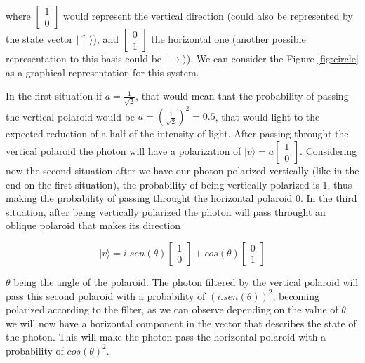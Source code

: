 where $\left[\begin{array}{c}
1\\
0
\end{array}\right]$ would represent the vertical direction (could also be represented by the state vector $\vert\uparrow\rangle$), and $\left[\begin{array}{c}
0\\
1
\end{array}\right] $ the horizontal one (another possible representation to this basis could be $\vert\rightarrow\rangle$). We can consider the Figure \ref{fig:circle} as a graphical representation for this system.

In the first situation if $a = \frac{1}{\sqrt{2}}$, that would mean that the probability of passing the vertical polaroid would be $a = (\frac{1}{\sqrt{2}})^{2} = 0.5$, that would light to the expected reduction of a half of the intensity of light. After passing throught the vertical polaroid the photon will have a polarization of $\vert v \rangle = a\left[\begin{array}{c}
1\\
0
\end{array}\right]$. Considering now the second situation after we have our photon polarized vertically (like in the end on the first situation), the probability of being vertically polarized is 1, thus making the probability of passing throught the horizontal polaroid 0.
In the third situation, after being vertically polarized the photon will pass throught an oblique polaroid that makes its direction

\begin{equation}
\vert v \rangle = i.sen(\theta) \left[\begin{array}{c}
1\\
0
\end{array}\right]+ cos(\theta)\left[\begin{array}{c}
0\\
1
\end{array}\right]
\end{equation}



$\theta$ being the angle of the polaroid. The photon filtered by the vertical polaroid will pass this second polaroid with a probability of $(i.sen(\theta))^{2}$, becoming polarized according to the filter, as we can observe depending on the value of $\theta$ we will now have a horizontal component in the vector that describes the state of the photon. This will make the photon pass the horizontal polaroid  with a probability of $cos(\theta)^{2}$. 

